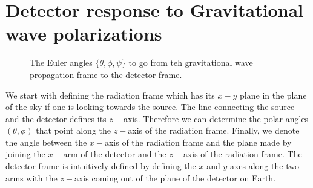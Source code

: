 % 



\section{Detector response to Gravitational wave polarizations}\label{sec:ligo_response}
\begin{figure}
 \begin{center}
 \end{center}
\caption{\label{fig:radiation_detector_frames}
The Euler angles $\{\theta,\phi,\psi\}$ to go from teh gravitational 
wave propagation frame to the detector frame.}
\end{figure}

We start with defining the radiation frame which has its $x-y$ plane in the 
plane of the sky if one is looking towards the source. The line connecting the 
source and the detector defines its $z-$axis. Therefore we can determine the 
polar angles $(\theta,\phi)$ that point along the $z-$axis of the 
radiation frame. Finally, we denote the angle between the $x-$axis of the 
radiation frame and the plane made by joining the $x-$arm of the detector and
the $z-$axis of the radiation frame. The detector frame is intuitively defined
by defining the $x$ and $y$ axes along the two arms with the $z-$axis coming
out of the plane of the detector on Earth.

